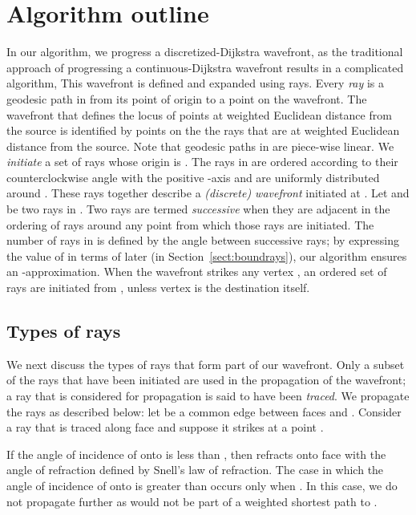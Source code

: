 \documentclass[11pt]{article}
\begin{document}
\section{Algorithm outline}
\label{sect:algooutline}

In our algorithm, we progress a discretized-Dijkstra wavefront, as the traditional approach of
progressing a continuous-Dijkstra wavefront results in a complicated algorithm, 
This wavefront is defined and expanded using rays.
Every {\it ray} is a geodesic path in  from its point of origin to a point on the wavefront.
The wavefront that defines the locus of points at weighted Euclidean distance  from the source is identified by points on the the rays that are at weighted Euclidean distance  from the source.
Note that geodesic paths in  are piece-wise linear.
We {\it initiate} a set  of rays whose origin is .
The rays in  are ordered according to their counterclockwise angle with the positive -axis and are uniformly distributed around .
These rays together describe  a {\it (discrete) wavefront} initiated at .
Let  and  be two rays in . Two rays are termed {\it successive} when
they are adjacent in the ordering of rays around any point from which those rays are initiated.
The number of rays in  is defined by the angle  between successive rays; by expressing the value of  in terms of  later (in Section~\ref{sect:boundrays}), our algorithm ensures an -approximation.
When the wavefront strikes any vertex , an ordered set  of rays are initiated from , unless vertex  is the destination  itself.

\subsection{Types of rays}

We next discuss the types of rays that form part of our wavefront.
Only a subset of the  rays that have been initiated are  used in the propagation of the wavefront; a ray that is considered for propagation is said to have been {\it traced}.
We propagate the rays as described below:
let  be a common edge between faces  and .
Consider a ray  that is traced along face  and suppose it strikes  at a point .

If the angle of incidence of  onto  is less than , then  refracts onto face  with the angle of refraction defined by Snell's law of refraction.
The case in which the angle of incidence of  onto  is greater than  occurs only when .
In this case, we do not propagate  further as  would not be part of a weighted shortest path to .
\end{document}
